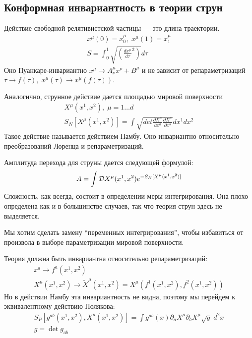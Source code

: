 \documentclass[a4paper,12pt]{article}
\theoremstyle{definition} \newtheorem{Def}{Definition}
\begin{document}
\subsection{Конформная инвариантность в теории струн}
\label{sec:conformal-invariance-strings}

Действие свободной релятивистской частицы --- это длина траектории.
\begin{equation}
  \label{eq:1}
  \begin{split}
  x^{\mu}(0)=x^{\mu}_0,\; x^{\mu}(1)=x^{\mu}_1\\
  S=\int_{0}^{1} \sqrt{\left(\frac{dx^{\mu}}{d\tau}^2\right)}d\tau
\end{split}
\end{equation}
Оно Пуанкаре-инвариантно $x^{\mu}\to A^{\mu}_{\nu}x^{\nu}+ B^{\mu}$ и не зависит от репараметризаций $\tau\to f(\tau),\; x^{\mu}(\tau)\to x^{\mu}(f(\tau))$.

Аналогично, струнное действие дается площадью мировой поверхности
\begin{equation}
  \label{eq:2}
  \begin{split}
    X^{\mu}(x^1,x^2),\; \mu=1\dots d\\
    S_N [X^{\mu}(x^1,x^2)]=\int \sqrt{det \frac{\partial X^{\mu}}{\partial x^a}\frac{\partial X^{\mu}}{\partial x^b}} dx^1 dx^2
  \end{split}
\end{equation}
Такое действие называется действием Намбу. Оно инвариантно относительно преобразований Лоренца и репараметризаций.

Амплитуда перехода для струны дается следующей формулой:
\begin{equation}
  \label{eq:3}
  A=\int {\cal D}X^{\mu}(x^1,x^2)e^{-S_N[X^{\mu}(x^1,x^2)]}
\end{equation}
Сложность, как всегда, состоит в определении меры интегрирования. Она плохо определена как и в большинстве случаев, так что теория струн здесь не выделяется.

Мы хотим сделать замену ``переменных интегрирования'', чтобы избавиться от произвола в выборе параметризации мировой поверхности.

Теория должна быть инвариантна относительно репараметризаций:
\begin{equation}
  \label{eq:4}
  \begin{split}
    x^a \to f^a (x^1,x^2)\\
    X^{\mu}(x^1,x^2)\to \tilde{X}^{\mu}(x^1,x^2)=X^{\mu}(f^1(x^1,x^2),f^2(x^1,x^2))
  \end{split}
\end{equation}
Но в действии Намбу эта инвариантность не видна, поэтому мы перейдем к эквивалентному действию Полякова:
\begin{equation}
  \label{eq:5}
  \begin{split}
    S_P [g^{ab}(x^1,x^2), X^{\mu}(x^1,x^2)]=\int g^{ab}(x)\partial_a X^{\mu} \partial_b X^{\mu}\sqrt{g} \;d^2 x\\
    g=\det g_{ab}
  \end{split}
\end{equation}
\end{document}
